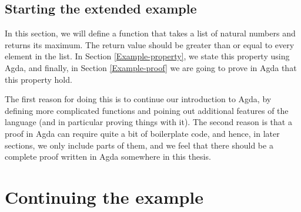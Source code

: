 \subsection{Starting the extended example}
\label{Example-start}
In this section, we will define a function that takes a list of natural numbers and returns its maximum. The return value should be greater than or equal to every element in the list. In Section \ref{Example-property}, we state this property using Agda, and finally, in Section \ref{Example-proof} we are going to prove in Agda that this property hold.

The first reason for doing this is to continue our introduction to Agda, by defining more complicated functions and poining out additional features of the language (and in particular proving things with it). The second reason is that a proof in Agda can require quite a bit of boilerplate code, and hence, in later sections, we only include parts of them, and we feel that there should be a complete proof written in Agda somewhere in this thesis.


\section{Continuing the example}
